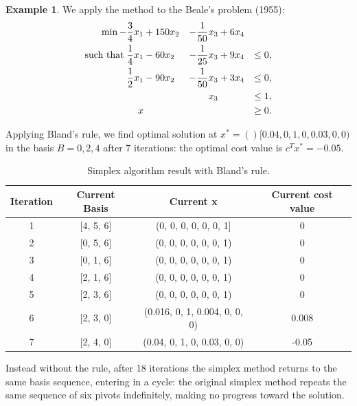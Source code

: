 \documentclass[a4paper,10 pt,titlepage,twoside]{report}
\theoremstyle{plain}
\theoremstyle{definition}
\newtheorem{ex}[thm]{Example}
\theoremstyle{remark}
\begin{document}
\begin{ex}
	We apply the method to the Beale's problem (1955): %
	\begin{alignat*}{4}
	\min -\frac{3}{4}x_{1}&+150x_{2}&-\frac{1}{50}x_{3}&+6x_{4}&\\
	\text{such that\;}\frac{1}{4}x_{1}&-60x_{2}&-\frac{1}{25}x_{3}&+9x_{4}&\leq 0,\\
	\frac{1}{2}x_{1}&-90x_{2}&-\frac{1}{50}x_{3}&+3x_{4}&\leq 0,\\
	&\;&x_{3}&\;&\leq 1,\\
	x&\;&\;&\;&\geq 0.\\
	\end{alignat*}
	
Applying Bland's rule, we find optimal solution at $x^{*} = ()[0.04, 0,  1,   0,  0.03, 0,   0  )$ in the basis $B = {0, 2, 4}$ after 7 iterations: the optimal cost value is $c^{T}x^{*} = -0.05$.\\

\begin{table}[h]
	\begin{center}
	\begin{tabular}{cccc}
		\hline
		\textbf{Iteration} & \textbf{Current Basis} & \textbf{Current x} & \textbf{Current cost value} \\ \hline
		1 & [4, 5, 6] & (0, 0, 0, 0, 0, 0, 1] & 0 \\
		2 & [0, 5, 6] & (0, 0, 0, 0, 0, 0, 1) & 0 \\
		3 & [0, 1, 6] & (0, 0, 0, 0, 0, 0, 1) & 0 \\
		4 & [2, 1, 6] & (0, 0, 0, 0, 0, 0, 1) & 0 \\
		5 & [2, 3, 6] & (0, 0, 0, 0, 0, 0, 1) & 0 \\
		6 & [2, 3, 0] & (0.016, 0, 1, 0.004, 0, 0, 0) & 0.008 \\
		7 & [2, 4, 0] & (0.04, 0, 1, 0, 0.03, 0, 0) & -0.05 \\ \hline
	\end{tabular}\caption{Simplex algorithm result with Bland's rule.}
\end{center}
\end{table}

Instead without the rule, after 18 iterations the simplex method returns to the same basis sequence, entering in a cycle: the original simplex method repeats the same sequence of six pivots indefinitely, making no progress toward the solution.


\end{ex}
\end{document}
